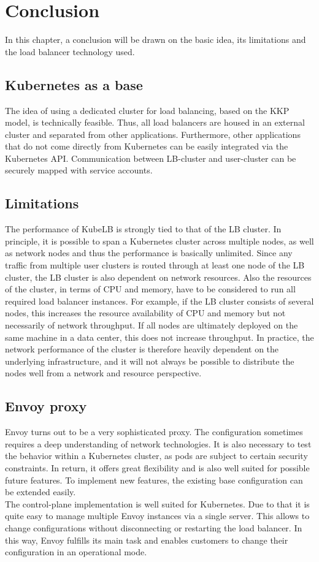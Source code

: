 \chapter{Conclusion}

In this chapter, a conclusion will be drawn on the basic idea, its limitations and the load balancer technology used.

\section{Kubernetes as a base}
The idea of using a dedicated cluster for load balancing, based on the KKP model, is technically feasible.
Thus, all load balancers are housed in an external cluster and separated from other applications.
Furthermore, other applications that do not come directly from Kubernetes can be easily integrated via the Kubernetes API.
Communication between LB-cluster and user-cluster can be securely mapped with service accounts.

\section{Limitations}
The performance of KubeLB is strongly tied to that of the LB cluster.
In principle, it is possible to span a Kubernetes cluster across multiple nodes, as well as network nodes and thus the performance is basically unlimited.
Since any traffic from multiple user clusters is routed through at least one node of the LB cluster, the LB cluster is also dependent on network resources.
Also the resources of the cluster, in terms of CPU and memory, have to be considered to run all required load balancer instances.
For example, if the LB cluster consists of several nodes, this increases the resource availability of CPU and memory but not necessarily of network throughput.
If all nodes are ultimately deployed on the same machine in a data center, this does not increase throughput.
In practice, the network performance of the cluster is therefore heavily dependent on the underlying infrastructure, and it will not always be possible to distribute the nodes well from a network and resource perspective.

\section{Envoy proxy}
Envoy turns out to be a very sophisticated proxy.
The configuration sometimes requires a deep understanding of network technologies.
It is also necessary to test the behavior within a Kubernetes cluster, as pods are subject to certain security constraints.
In return, it offers great flexibility and is also well suited for possible future features.
To implement new features, the existing base configuration can be extended easily.
\\
The control-plane implementation is well suited for Kubernetes.
Due to that it is quite easy to manage multiple Envoy instances via a single server.
This allows to change configurations without disconnecting or restarting the load balancer.
In this way, Envoy fulfills its main task and enables customers to change their configuration in an operational mode.
